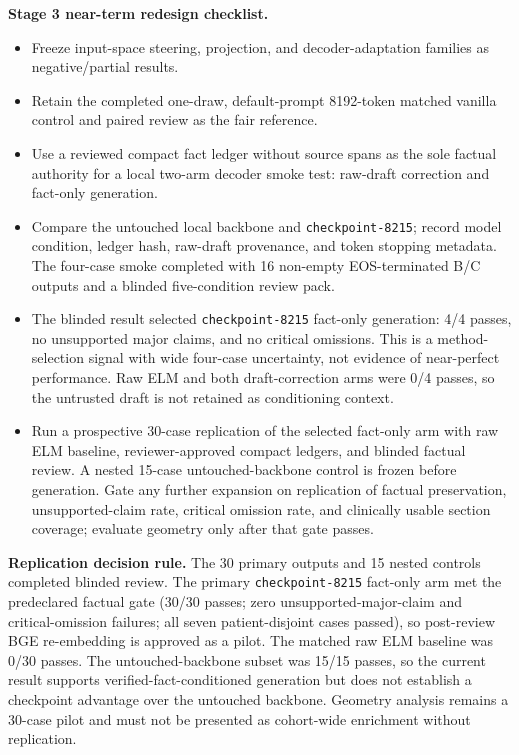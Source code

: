 \documentclass[11pt]{article}
\begin{document}
\textbf{Stage 3 near-term redesign checklist.}
\begin{itemize}[nosep]
  \item Freeze input-space steering, projection, and decoder-adaptation families as negative/partial results.
  \item Retain the completed one-draw, default-prompt 8192-token matched vanilla control and paired review as the fair reference.
  \item Use a reviewed compact fact ledger without source spans as the sole factual authority for a local two-arm decoder smoke test: raw-draft correction and fact-only generation.
  \item Compare the untouched local backbone and \texttt{checkpoint-8215}; record model condition, ledger hash, raw-draft provenance, and token stopping metadata. The four-case smoke completed with 16 non-empty EOS-terminated B/C outputs and a blinded five-condition review pack.
  \item The blinded result selected \texttt{checkpoint-8215} fact-only generation: 4/4 passes, no unsupported major claims, and no critical omissions. This is a method-selection signal with wide four-case uncertainty, not evidence of near-perfect performance. Raw ELM and both draft-correction arms were 0/4 passes, so the untrusted draft is not retained as conditioning context.
  \item Run a prospective 30-case replication of the selected fact-only arm with raw ELM baseline, reviewer-approved compact ledgers, and blinded factual review. A nested 15-case untouched-backbone control is frozen before generation. Gate any further expansion on replication of factual preservation, unsupported-claim rate, critical omission rate, and clinically usable section coverage; evaluate geometry only after that gate passes.
\end{itemize}

\textbf{Replication decision rule.}
The 30 primary outputs and 15 nested controls completed blinded review. The primary \texttt{checkpoint-8215} fact-only arm met the predeclared factual gate (30/30 passes; zero unsupported-major-claim and critical-omission failures; all seven patient-disjoint cases passed), so post-review BGE re-embedding is approved as a pilot. The matched raw ELM baseline was 0/30 passes. The untouched-backbone subset was 15/15 passes, so the current result supports verified-fact-conditioned generation but does not establish a checkpoint advantage over the untouched backbone. Geometry analysis remains a 30-case pilot and must not be presented as cohort-wide enrichment without replication.
\end{document}
